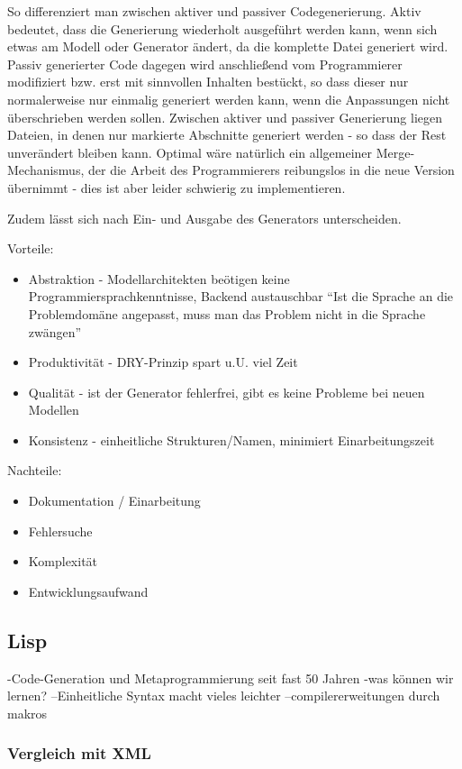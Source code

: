 \documentclass[a4paper, bibgerm]{article}
\begin{document}
So differenziert man zwischen aktiver und passiver
Codegenerierung. Aktiv bedeutet, dass die Generierung wiederholt
ausgeführt werden kann, wenn sich etwas am Modell oder Generator ändert,
da die komplette Datei generiert wird. Passiv generierter Code dagegen
wird anschließend vom Programmierer modifiziert bzw. erst mit sinnvollen
Inhalten bestückt, so dass dieser nur normalerweise nur einmalig
generiert werden kann, wenn die Anpassungen nicht überschrieben werden
sollen. Zwischen aktiver und passiver Generierung liegen Dateien, in
denen nur markierte Abschnitte generiert werden - so dass der Rest
unverändert bleiben kann. Optimal wäre natürlich ein allgemeiner
Merge-Mechanismus, der die Arbeit des Programmierers reibungslos in die
neue Version übernimmt - dies ist aber leider schwierig zu
implementieren.

Zudem lässt sich nach Ein- und Ausgabe des Generators unterscheiden.

Vorteile:
\begin{itemize}
\item Abstraktion - Modellarchitekten beötigen keine
  Programmiersprachkenntnisse, Backend austauschbar
``Ist die Sprache an die Problemdomäne angepasst, muss man das Problem
nicht in die Sprache zwängen''
\item Produktivität - DRY-Prinzip spart u.U. viel Zeit
\item Qualität - ist der Generator fehlerfrei, gibt es keine Probleme
  bei neuen Modellen
\item Konsistenz - einheitliche Strukturen/Namen, minimiert Einarbeitungszeit
\end{itemize}

Nachteile:
\begin{itemize}
\item Dokumentation / Einarbeitung
\item Fehlersuche
\item Komplexität
\item Entwicklungsaufwand
\end{itemize}

\subsection{Lisp}
\label{sec:into:lisp}

-Code-Generation und Metaprogrammierung seit fast 50 Jahren
-was können wir lernen?
--Einheitliche Syntax macht vieles leichter
--compilererweitungen durch makros

\subsubsection{Vergleich mit XML}
\label{sec:intro:lisp:xml}
\end{document}
